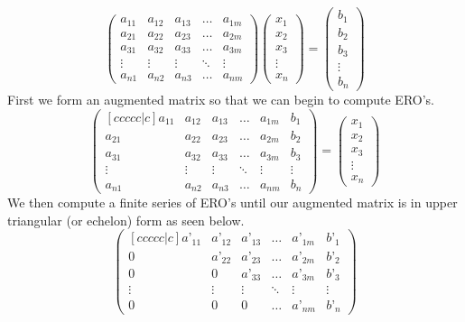 \documentclass[12pt,reqno,twoside,titlepage]{article}
\theoremstyle{definition}
\begin{document}
\begin{equation*}
    \begin{pmatrix}
    a_{11} & a_{12} & a_{13} & \dots & a_{1m} \\
    a_{21} & a_{22} & a_{23} & \dots & a_{2m} \\
    a_{31} & a_{32} & a_{33} & \dots & a_{3m} \\
    \vdots & \vdots & \vdots & \ddots & \vdots \\
    a_{n1} & a_{n2} & a_{n3} & \dots & a_{nm}
    \end{pmatrix}
    \begin{pmatrix}
    x_{1} \\
    x_{2} \\
    x_{3} \\
    \vdots \\
    x_{n}
    \end{pmatrix}
    =
    \begin{pmatrix}
    b_{1} \\
    b_{2} \\
    b_{3} \\
    \vdots \\
    b_{n}
    \end{pmatrix}
\end{equation*}
\newline
First we form an augmented matrix so that we can begin to compute ERO’s.
\begin{equation*}
\begin{pmatrix}[ccccc|c]
a_{11} & a_{12} & a_{13} & \dots & a_{1m} & b_{1} \\
a_{21} & a_{22} & a_{23} & \dots & a_{2m} & b_{2} \\
a_{31} & a_{32} & a_{33} & \dots & a_{3m} & b_{3} \\
\vdots & \vdots & \vdots & \ddots & \vdots & \vdots \\
a_{n1} & a_{n2} & a_{n3} & \dots & a_{nm} & b_{n}
\end{pmatrix}
=
\begin{pmatrix}
x_{1} \\
x_{2} \\
x_{3} \\
\vdots \\
x_{n}
\end{pmatrix}
\end{equation*}
We then compute a finite series of ERO’s until our augmented matrix is in upper triangular (or echelon) form as seen below.
\begin{equation*}
    \begin{pmatrix}[ccccc|c]
    a’_{11} & a’_{12} & a’_{13} & \dots & a’_{1m} & b’_{1} \\
    0 & a’_{22} & a’_{23} & \dots & a’_{2m} & b’_{2} \\
    0 & 0 & a’_{33} & \dots & a’_{3m} & b’_{3} \\
    \vdots & \vdots & \vdots & \ddots & \vdots & \vdots \\
    0 & 0 & 0 & \dots & a’_{nm} & b’_{n}
    \end{pmatrix}
\end{equation*}
\end{document}
